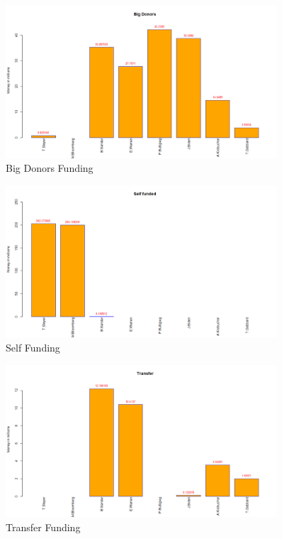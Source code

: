 \begin{figure}[H]
    \centering
    \includegraphics[width=0.9\textwidth]{figures/Bigdonor.png}
    \caption{Big Donors Funding}
    \label{Bigdonor}
\end{figure}

\begin{figure}[H]
    \centering
    \includegraphics[width=0.9\textwidth]{figures/Selffunnded.png}
    \caption{Self Funding}
    \label{Selffunnded}
\end{figure}

\begin{figure}[H]
    \centering
    \includegraphics[width=0.9\textwidth]{figures/Transfer.png}
    \caption{Transfer Funding}
    \label{Transfer}
\end{figure}

